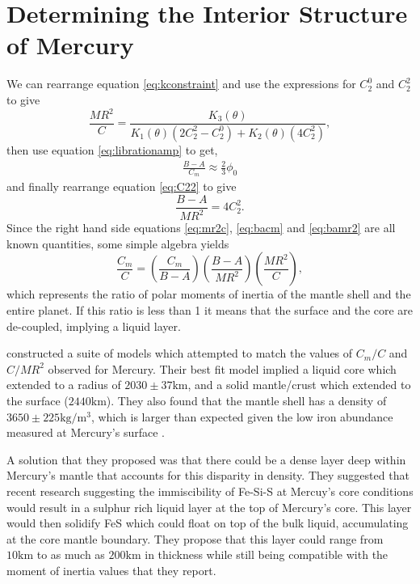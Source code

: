 \section{Determining the Interior Structure of Mercury}
We can rearrange equation \ref{eq:kconstraint} and use the expressions for $C_2^0$ and $C_2^2$ to give
\begin{equation}
\label{eq:mr2c}
\frac{M R^2}{C}=\frac{K_3\left(\theta\right)}{K_1\left(\theta\right)\left(2C_2^2-C_2^0\right)+K_2\left(\theta\right)\left(4C_2^2\right)},
\end{equation}
then use equation \ref{eq:librationamp} to get,
\begin{align}
\label{eq:bacm}
\frac{B-A}{C_m}\approx\frac{2}{3}\phi_{0}
\end{align}
and finally rearrange equation \ref{eq:C22} to give
\begin{equation}
\label{eq:bamr2}
\frac{B-A}{MR^2}=4C_2^2.
\end{equation}
Since the right hand side equations \ref{eq:mr2c}, \ref{eq:bacm} and \ref{eq:bamr2} are all known quantities, some simple algebra yields
\begin{equation}
\frac{C_m}{C}=\left(\frac{C_m}{B-A}\right)\left(\frac{B-A}{MR^2}\right)\left(\frac{MR^{2}}{C}\right),
\end{equation}
which represents the ratio of polar moments of inertia of the mantle shell and the entire planet. If this ratio is less than 1 it means that the surface and the core are de-coupled, implying a liquid layer.

\citet{smith2012} constructed a suite of models which attempted to match the values of $C_m/C$ and $C/MR^2$ observed for Mercury. Their best fit model implied a liquid core which extended to a radius of $2030 \pm37 \textrm{km}$, and a solid mantle/crust which extended to the surface ($2440\textrm{km}$). They also found that the mantle shell has a density of $3650\pm225 \textrm{kg}/\textrm{m}^3$, which is larger than expected given the low iron abundance measured at Mercury's surface \citep{nittler2011}.

A solution that they proposed was that there could be a dense layer deep within Mercury's mantle that accounts for this disparity in density. They suggested that recent research suggesting the immiscibility of Fe-Si-S at Mercuy's core conditions would result in a sulphur rich liquid layer at the top of Mercury's core. This layer would then solidify FeS which could float on top of the bulk liquid, accumulating at the core mantle boundary. They propose that this layer could range from $10\textrm{km}$ to as much as $200\textrm{km}$ in thickness while still being compatible with the moment of inertia values that they report.

